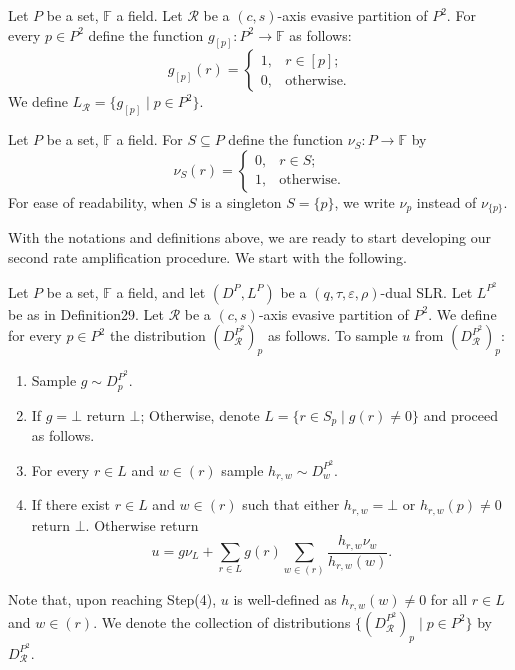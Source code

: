 \begin{ntdefinition}
Let $P$ be a set, $\mathbb F$ a field. Let $\mathcal R$ be a $(c,s)$-axis evasive partition of $P^2$. For every $p\in P^2$ define the function $g_{[p]}:P^2\to\mathbb F$ as follows:
\[g_{[p]}(r)=\begin{cases}1,&r\in[p];\\0,&\text{otherwise}.\end{cases}\]
We define $L_{\mathcal R}=\{g_{[p]}\mid p\in P^2\}$.
\end{ntdefinition}
\begin{ntdefinition}
Let $P$ be a set, $\mathbb F$ a field. For $S\subseteq P$ define the function $\nu_S:P\to\mathbb F$ by
\[\nu_S(r)=\begin{cases}0,&r\in S;\\1,&\text{otherwise}.\end{cases}\]
For ease of readability, when $S$ is a singleton $S=\{p\}$, we write $\nu_p$ instead of $\nu_{\{p\}}$.
\end{ntdefinition}
With the notations and definitions above, we are ready to start developing our second rate amplification procedure. We start with the following.
\begin{ntdefinition}
Let $P$ be a set, $\mathbb F$ a field, and let $(D^P,L^P)$ be a $(q,\tau,\varepsilon,\rho)$-dual SLR. Let $L^{P^2}$ be as in Definition29. Let $\mathcal R$ be a $(c,s)$-axis evasive partition of $P^2$. We define for every $p\in P^2$ the distribution $(D_{\mathcal R}^{P^2})_p$ as follows. To sample $u$ from $(D_{\mathcal R}^{P^2})_p$:
\begin{enumerate}
\item Sample $g\sim D_p^{P^2}$.
\item If $g=\bot$ return $\bot$; Otherwise, denote $L=\{r\in S_p\mid g(r)\ne0\}$ and proceed as follows.
\item For every $r\in L$ and $w\in(r)$ sample $h_{r,w}\sim D_w^{P^2}$.
\item If there exist $r\in L$ and $w\in(r)$ such that either $h_{r,w}=\bot$ or $h_{r,w}(p)\ne0$ return $\bot$. Otherwise return
\begin{equation}u=g\nu_L+\sum_{r\in L}g(r)\sum_{w\in(r)}\frac{h_{r,w}\nu_w}{h_{r,w}(w)}.\tag{4.3}\end{equation}
\end{enumerate}
Note that, upon reaching Step(4), $u$ is well-defined as $h_{r,w}(w)\ne0$ for all $r\in L$ and $w\in(r)$. We denote the collection of distributions $\{(D_{\mathcal R}^{P^2})_p\mid p\in P^2\}$ by $D_{\mathcal R}^{P^2}$.
\end{ntdefinition}
